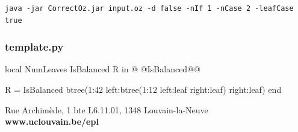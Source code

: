 \documentclass[11pt,a4paper,twoside,openright]{report}
\begin{document}
\begin{lstlisting}
java -jar CorrectOz.jar input.oz -d false -nIf 1 -nCase 2 -leafCase true 
\end{lstlisting}

\subsubsection*{template.py}
\begin{OZ}
local NumLeaves IsBalanced R in
@	@IsBalanced@@

	R = {IsBalanced btree(1:42 left:btree(1:12 left:leaf right:leaf) 
right:leaf)}
end
\end{OZ}

%
%
%



\newpage
{}
\vspace*{17.75cm}
\noindent \footnotesize \color{UCLblue}  \selectfont Rue 
Archim\`{e}de, 1 bte L6.11.01, 1348 Louvain-la-Neuve ~ ~ \color{EPLblue} 
\textbf{www.uclouvain.be/epl} \\
\vspace*{6pt}
\color{EPLblue}{\rule{18.5cm}{8.25cm}}
\end{document}
